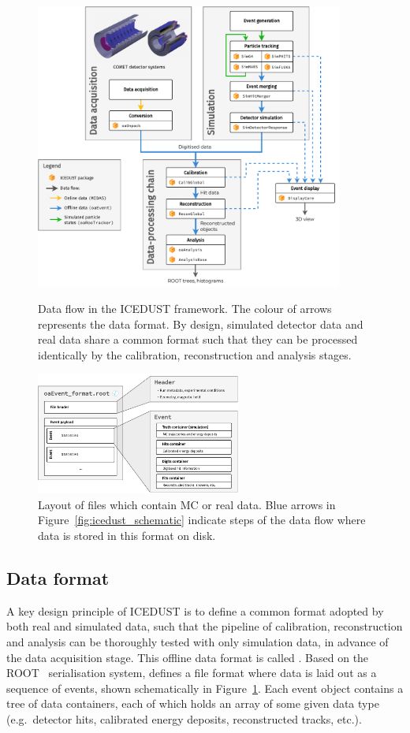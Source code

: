 \begin{figure}
    \centering
    \includegraphics[width=0.9\textwidth]{chapter3/ICEDUST_vertical.drawio.pdf}
    \caption{Data flow in the ICEDUST framework. The colour of arrows represents
        the data format. By design, simulated detector data and real data share
        a common format such that they can be processed identically by the
        calibration, reconstruction and analysis stages.}
    \label{fig:icedust_schematic}
    \vspace{1.2cm}
    \includegraphics[width=0.6\textwidth]{chapter3/oaEvent.drawio.pdf}
    \caption{Layout of \oaEvent files which contain MC or real data. Blue arrows
    in Figure~\ref{fig:icedust_schematic} indicate steps of the data flow where
    data is stored in this format on disk.}
    \label{fig:oaEvent}
\end{figure}

\subsection{Data format}
A key design principle of ICEDUST is to define a common format adopted by both
real and simulated data, such that the pipeline of calibration, reconstruction
and analysis can be thoroughly tested with only simulation data, in advance of
the data acquisition stage. This offline data format is called \oaEvent. Based
on the ROOT~\cite{BRUN199781} serialisation system, \oaEvent defines a file
format where data is laid out as a sequence of events, shown schematically in
Figure~\ref{fig:oaEvent}. Each event object contains a tree of data containers,
each of which holds an array of some given data type (e.g.\ detector hits,
calibrated energy deposits, reconstructed tracks, etc.).

